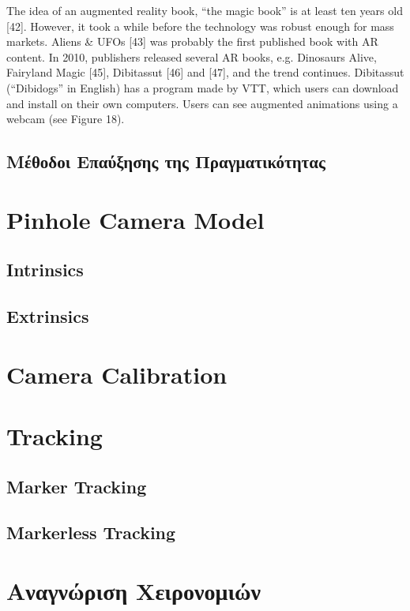 The idea of an augmented reality book, “the magic book” is at least ten years old [42]. However, it took a while before the technology was robust enough for mass markets. Aliens \& UFOs [43] was probably the first published book with AR content. In 2010, publishers released several AR books, e.g. Dinosaurs Alive\! [44], Fairyland Magic [45], Dibitassut [46] and [47], and the trend continues. Dibitassut (“Dibidogs” in English) has a program made by VTT, which users can download and install on their own computers. Users can see augmented animations using a webcam (see Figure 18).

\subsection{Μέθοδοι Επαύξησης της Πραγματικότητας}



\section{Pinhole Camera Model}
\subsection{Intrinsics}
\subsection{Extrinsics}
\section{Camera Calibration}

\section{Tracking}
\subsection{Marker Tracking}
    
\subsection{Markerless Tracking}





\section{Αναγνώριση Χειρονομιών}

